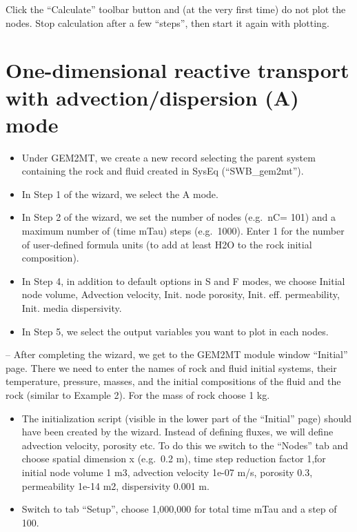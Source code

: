\documentclass[
]{book}
\begin{document}
Click the ``Calculate'' toolbar button and (at the very first time) do not plot the nodes. Stop calculation after a few ``steps'', then start it again with plotting.

\hypertarget{one-dimensional-reactive-transport-with-advectiondispersion-a-mode}{%
\section{One-dimensional reactive transport with advection/dispersion (A) mode}\label{one-dimensional-reactive-transport-with-advectiondispersion-a-mode}}

\begin{itemize}
\item
  Under GEM2MT, we create a new record selecting the parent system containing the rock and fluid created in SysEq (``SWB\_gem2mt'').
\item
  In Step 1 of the wizard, we select the A mode.
\item
  In Step 2 of the wizard, we set the number of nodes (e.g.~nC= 101) and a maximum number of (time mTau) steps (e.g.~1000). Enter 1 for the number of user-defined formula units (to add at least H2O to the rock initial composition).
\item
  In Step 4, in addition to default options in S and F modes, we choose Initial node volume, Advection velocity, Init. node porosity, Init. eff. permeability, Init. media dispersivity.
\item
  In Step 5, we select the output variables you want to plot in each nodes.
\end{itemize}

-- After completing the wizard, we get to the GEM2MT module window ``Initial'' page. There we need to enter the names of rock and fluid initial systems, their temperature, pressure, masses, and the initial compositions of the fluid and the rock (similar to Example 2). For the mass of rock choose 1 kg.

\begin{itemize}
\item
  The initialization script (visible in the lower part of the ``Initial'' page) should have been created by the wizard. Instead of defining fluxes, we will define advection velocity, porosity etc. To do this we switch to the ``Nodes'' tab and choose spatial dimension x (e.g.~0.2 m), time step reduction factor 1,for initial node volume 1 m3, advection velocity 1e-07 m/s, porosity 0.3, permeability 1e-14 m2, dispersivity 0.001 m.
\item
  Switch to tab ``Setup'', choose 1,000,000 for total time mTau and a step of 100.
\end{itemize}
\end{document}
